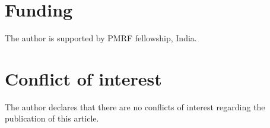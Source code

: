 \documentclass[oneside, 12pt]{amsart} \topmargin      -10mm \textwidth      160 true mm
\theoremstyle{definition}
\numberwithin{equation}{section}
\begin{document}
\section*{Funding}
\noindent The author is supported by PMRF fellowship, India.
\section*{Conflict of interest}
\noindent The author declares that there are no conflicts of interest regarding the publication of this article.
	

\end{document}
